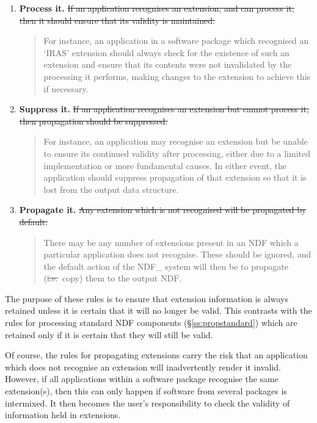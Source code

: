 \begin{enumerate}

\item {\bf Process it.}
\st{If an application recognises an extension, and can process it, then it
should ensure that its validity is maintained.} 

\small
\begin{quote}
For instance, an application in a software package which recognised an
`IRAS' extension should always check for the existence of such an extension
and ensure that its contents were not invalidated by the processing it
performs, making changes to the extension to achieve this if necessary. 
\end{quote}
\normalsize

\item {\bf Suppress it.}
\st{If an application recognises an extension but cannot process it, then 
propagation should be suppressed.}

\small
\begin{quote}
For instance, an application may recognise an extension but be unable to 
ensure its continued validity after processing, either due to a limited 
implementation or more fundamental causes.
In either event, the application should suppress propagation of that 
extension so that it is lost from the output data structure.
\end{quote}
\normalsize

\item {\bf Propagate it.}
\st{Any extension which is not recognised will be propagated by default.} 

\small
\begin{quote}
There may be any number of extensions present in an NDF which a particular 
application does not recognise.
These should be ignored, and the default action of the NDF\_ system will 
then be to propagate (\st{i.e.}\ copy) them to the output NDF.
\end{quote}
\normalsize


\end{enumerate}

The purpose of these rules is to ensure that extension information is always
retained unless it is certain that it will no longer be valid.
This contrasts with the rules for processing standard NDF components
(\S\ref{ss:propstandard}) which are retained only if it is certain that they
will still be valid. 

Of course, the rules for propagating extensions carry the risk that an
application which does not recognise an extension will inadvertently render
it invalid.
However, if all applications within a software package recognise the same
extension(s), then this can only happen if software from several packages is
intermixed. 
It then becomes the user's responsibility to check the validity of
information held in extensions. 

